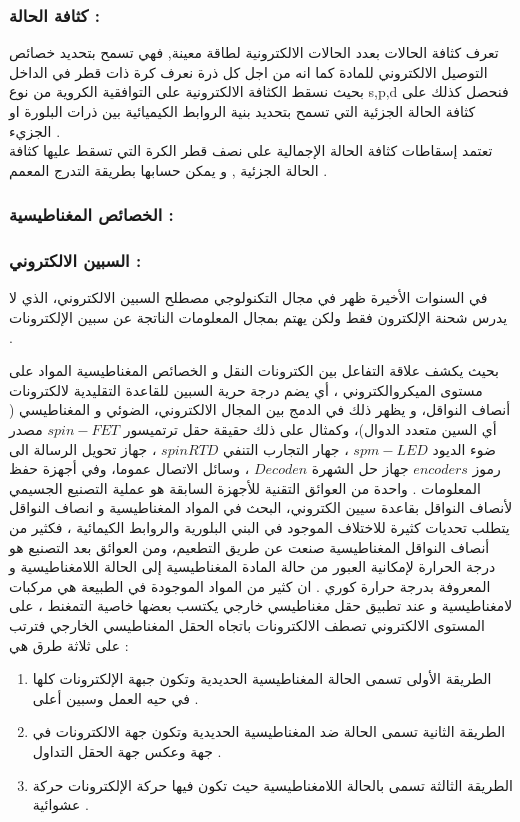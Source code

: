 							\subsubsection*{كثافة الحالة :}
		 تعرف كثافة الحالات بعدد الحالات الالكترونية لطاقة معينة, فهي تسمح بتحديد خصائص التوصيل الالكتروني للمادة كما انه من اجل كل ذرة نعرف كرة ذات قطر في الداخل بحيث نسقط الكثافة الالكترونية على التوافقية الكروية من نوع s,p,d فنحصل كذلك على كثافة الحالة الجزئية التي تسمح بتحديد بنية الروابط الكيميائية بين ذرات البلورة او الجزيء .\\
		تعتمد إسقاطات كثافة الحالة الإجمالية على نصف قطر الكرة التي تسقط عليها كثافة الحالة الجزئية , و يمكن حسابها بطريقة التدرج المعمم .
	
		\subsubsection{الخصائص المغناطيسية : }
		\subsubsection*{السبين الالكتروني : }
	 
	في السنوات الأخيرة ظهر في مجال التكنولوجي مصطلح السبين الالكتروني، الذي لا يدرس شحنة الإلكترون فقط ولكن يهتم بمجال المعلومات الناتجة عن سبين الإلكترونات .
	
بحيث يكشف علاقة التفاعل بين الكترونات النقل و الخصائص المغناطيسية المواد على مستوى الميكروالكتروني ، أي يضم درجة حرية السبين للقاعدة التقليدية لالكترونات أنصاف النواقل، و يظهر ذلك في الدمج بين المجال الالكتروني، الضوئي و المغناطيسي ( أي السين متعدد الدوال)، وكمثال على ذلك حقيقة حقل ترتمیسور $ spin-FET $ مصدر ضوء الديود $ spm-LED $ ، جهار التجارب التنفي	$ spin RTD  $ ، جهاز تحويل الرسالة الى رموز $ encoders $ جهاز حل الشهرة $ Decoden $ ، وسائل الاتصال عموما، وفي أجهزة حفظ المعلومات .
واحدة من العوائق التقنية للأجهزة السابقة هو عملية التصنيع الجسيمي لأنصاف النواقل بقاعدة سيين الكتروني، البحث في المواد المغناطيسية و انصاف النواقل يتطلب تحديات كثيرة للاختلاف الموجود في البني البلورية والروابط الكيمائية ، فكثير من أنصاف النواقل المغناطيسية صنعت عن طريق التطعيم، ومن العوائق بعد التصنيع هو درجة الحرارة لإمكانية العبور من حالة المادة المغناطيسية إلى الحالة اللامغناطيسية و المعروفة بدرجة حرارة كوري  .
	ان كثير من المواد الموجودة في الطبيعة هي مركبات لامغناطيسية و عند تطبيق حقل مغناطيسي خارجي يكتسب بعضها خاصية التمغنط ، على المستوى الالكتروني تصطف الالكترونات باتجاه الحقل المغناطيسي الخارجي فترتب على ثلاثة طرق هي :
	\begin{enumerate}
		\item 
		الطريقة الأولى تسمى الحالة المغناطيسية الحديدية وتكون جبهة الإلكترونات كلها في حيه العمل وسبين أعلى .
				\item 
		الطريقة الثانية تسمى الحالة ضد المغناطيسية الحديدية وتكون جهة الالكترونات في جهة وعكس جهة الحقل التداول .
		\item
		الطريقة الثالثة تسمى بالحالة اللامغناطيسية حيث تكون فيها حركة الإلكترونات حركة عشوائية .
	\end{enumerate}
	 
